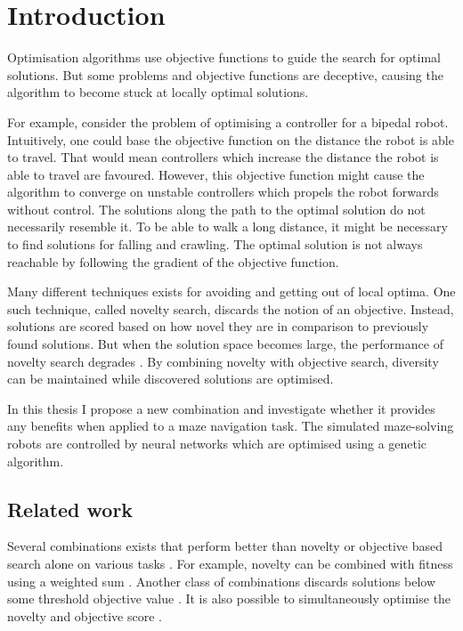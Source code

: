 \section{Introduction}

\label{sec:intro}

Optimisation algorithms use objective functions to guide the search for optimal solutions.
But some problems and objective functions are deceptive, causing the algorithm to become stuck at
locally optimal solutions.

For example, consider the problem of optimising a controller for a bipedal
robot. Intuitively, one could base the objective function on the distance the robot is able to travel.
That would mean controllers which increase the distance the robot is able to travel are favoured.
However, this objective function might cause the algorithm to converge on unstable controllers which
propels the robot forwards without control. The solutions along the path to the optimal solution
do not necessarily resemble it. To be able to walk a long distance, it might be necessary to find
solutions for falling and crawling. The optimal solution is not always reachable by following
the gradient of the objective function.

Many different techniques exists for avoiding and getting out of local optima. One such technique, called
novelty search, discards the notion of an objective. Instead, solutions are scored based on how novel
they are in comparison to previously found solutions. But when the solution space becomes large, the performance
of novelty search degrades \cite{novelty_not_enough}. By combining novelty with objective search, diversity
can be maintained while discovered solutions are optimised.

In this thesis I propose a new combination and investigate whether it provides any benefits
when applied to a maze navigation task. The simulated maze-solving robots are controlled by
neural networks which are optimised using a genetic algorithm.

\subsection{Related work}
Several combinations exists that perform better than novelty or objective based search alone
on various tasks \cite{ns_study}. For example, novelty can be combined with fitness using a
weighted sum \cite{novelty_not_enough}. Another class of combinations discards solutions below
some threshold objective value \cite{minimal_ns}. It is also possible to simultaneously optimise
the novelty and objective score \cite{multi_ns}.
